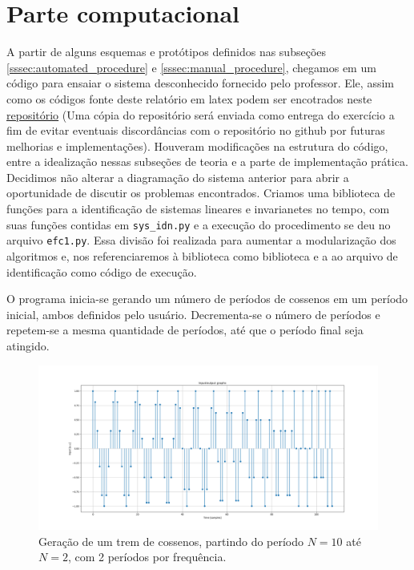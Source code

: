 \documentclass[x11names,a4paper,12pt]{article}
\begin{document}
\section{Parte computacional}

A partir de alguns esquemas e protótipos definidos nas subseções \ref{sssec:automated_procedure} e \ref{sssec:manual_procedure}, chegamos em um código para ensaiar o sistema desconhecido fornecido pelo professor. Ele, assim como os códigos fonte deste relatório em latex podem ser encotrados neste \href{https://github.com/georgekontogiorgos/ie550_1s2020}{repositório} (Uma cópia do repositório será enviada como entrega do exercício a fim de evitar eventuais discordâncias com o repositório no github por futuras melhorias e implementações). Houveram modificações na estrutura do código, entre a idealização nessas subseções de teoria e a parte de implementação prática. Decidimos não alterar a diagramação do sistema anterior para abrir a oportunidade de discutir os problemas encontrados.
Criamos uma biblioteca de funções para a identificação de sistemas lineares e invarianetes no tempo, com suas funções contidas em \texttt{sys\_idn.py} e a execução do procedimento se deu no arquivo \texttt{efc1.py}. Essa divisão foi realizada para aumentar a modularização dos algoritmos e, nos referenciaremos à biblioteca como biblioteca e a ao arquivo de identificação como código de execução.

O programa inicia-se gerando um número de períodos de cossenos em um período inicial, ambos definidos pelo usuário. Decrementa-se o número de períodos e repetem-se a mesma quantidade de períodos, até que o período final seja atingido.

\begin{figure}[H]
  \centering
  \includegraphics[scale=0.25]{figures/cos_sweep_N_10_to_N_2_P_2.PNG}
  \caption{Geração de um trem de cossenos, partindo do período $N=10$ até $N=2$, com 2 períodos por frequência.}\label{fig:cos_sweep_N_10_to_N_2_P_2}
\end{figure}
\end{document}
